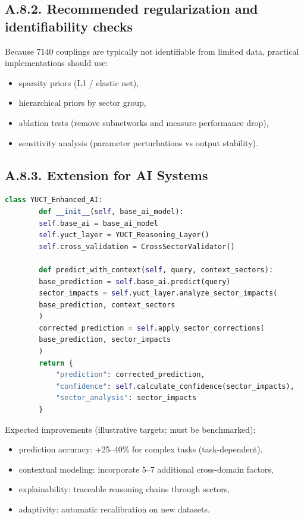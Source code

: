 \documentclass[13pt,a4paper]{article}
\begin{document}
	\subsection*{A.8.2. Recommended regularization and identifiability checks}
	Because 7140 couplings are typically not identifiable from limited data, practical implementations should use:
	\begin{itemize}[leftmargin=*]
		\item sparsity priors (L1 / elastic net),
		\item hierarchical priors by sector group,
		\item ablation tests (remove subnetworks and measure performance drop),
		\item sensitivity analysis (parameter perturbations vs output stability).
	\end{itemize}
	
	\subsection*{A.8.3. Extension for AI Systems}
	
	\begin{lstlisting}[language=Python]
		class YUCT_Enhanced_AI:
		def __init__(self, base_ai_model):
		self.base_ai = base_ai_model
		self.yuct_layer = YUCT_Reasoning_Layer()
		self.cross_validation = CrossSectorValidator()
		
		def predict_with_context(self, query, context_sectors):
		base_prediction = self.base_ai.predict(query)
		sector_impacts = self.yuct_layer.analyze_sector_impacts(
		base_prediction, context_sectors
		)
		corrected_prediction = self.apply_sector_corrections(
		base_prediction, sector_impacts
		)
		return {
			"prediction": corrected_prediction,
			"confidence": self.calculate_confidence(sector_impacts),
			"sector_analysis": sector_impacts
		}
	\end{lstlisting}
	
	Expected improvements (illustrative targets; must be benchmarked):
	\begin{itemize}[leftmargin=*]
		\item prediction accuracy: +25--40\% for complex tasks (task-dependent),
		\item contextual modeling: incorporate 5--7 additional cross-domain factors,
		\item explainability: traceable reasoning chains through sectors,
		\item adaptivity: automatic recalibration on new datasets.
	\end{itemize}
	
\end{document}
